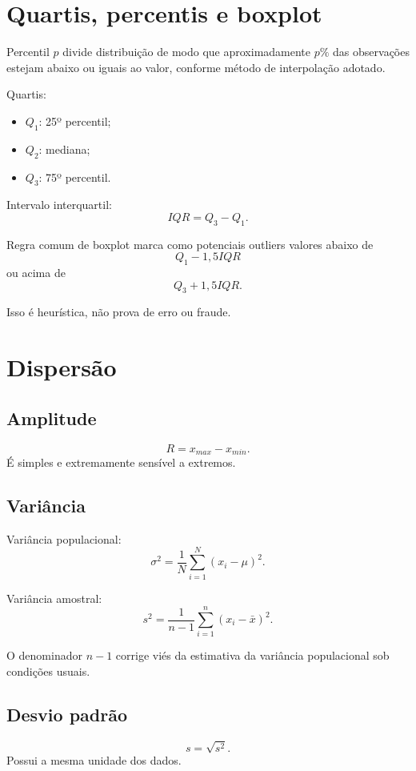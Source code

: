 \section{Quartis, percentis e boxplot}

Percentil $p$ divide distribuição de modo que aproximadamente $p\%$ das observações estejam abaixo ou iguais ao valor, conforme método de interpolação adotado.

Quartis:
\begin{itemize}
\item $Q_1$: 25º percentil;
\item $Q_2$: mediana;
\item $Q_3$: 75º percentil.
\end{itemize}

Intervalo interquartil:
\[
IQR=Q_3-Q_1.
\]

Regra comum de boxplot marca como potenciais outliers valores abaixo de
\[
Q_1-1{,}5IQR
\]
ou acima de
\[
Q_3+1{,}5IQR.
\]

Isso é heurística, não prova de erro ou fraude.

\section{Dispersão}

\subsection{Amplitude}

\[
R=x_{max}-x_{min}.
\]
É simples e extremamente sensível a extremos.

\subsection{Variância}

Variância populacional:
\[
\sigma^2=\frac{1}{N}\sum_{i=1}^{N}(x_i-\mu)^2.
\]

Variância amostral:
\[
s^2=\frac{1}{n-1}\sum_{i=1}^{n}(x_i-\bar{x})^2.
\]

O denominador $n-1$ corrige viés da estimativa da variância populacional sob condições usuais.

\subsection{Desvio padrão}

\[
s=\sqrt{s^2}.
\]
Possui a mesma unidade dos dados.


